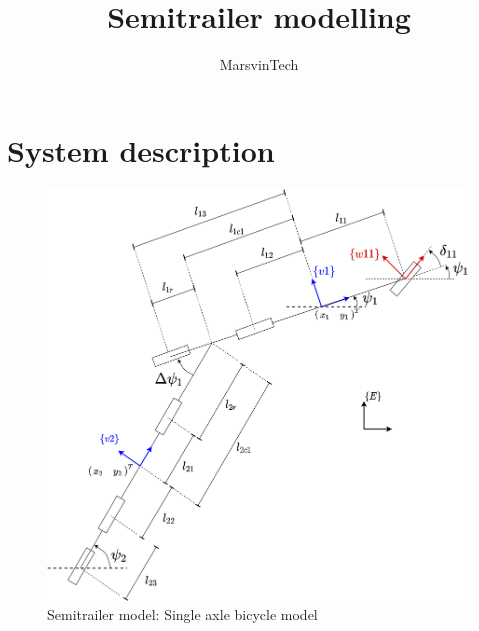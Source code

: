 \documentclass[12pt]{article}
\title{Semitrailer modelling}
\author{MarsvinTech}
\begin{document}
\maketitle

\section{System description}
\begin{figure}[H]
    \centering
    \includegraphics[scale=0.5]{images/semitrailer_modelling_1.png}
    \caption{Semitrailer model: Single axle bicycle model}
    \label{semitrailer_system}
\end{figure}
\end{document}
